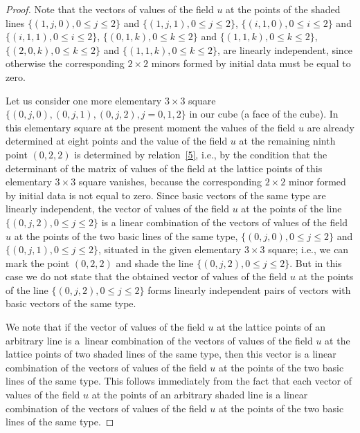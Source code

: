 \documentclass[pdftex]{sigma}
\begin{document}
\begin{proof}
Note that the vectors of values of the f\/ield $u$ at the points of
the shaded lines $\{(1, j, 0), 0 \leq j \leq 2\}$ and $\{(1, j, 1),
0 \leq j \leq 2\}$, $\{(i, 1, 0), 0 \leq i \leq 2\}$ and $\{(i, 1,
1), 0 \leq i \leq 2\}$, $\{(0, 1, k), 0 \leq k \leq 2\}$ and $\{(1,
1, k), 0 \leq k \leq 2\}$, $\{(2, 0, k), 0 \leq k \leq 2\}$ and
$\{(1, 1, k), 0 \leq k \leq 2\}$, are linearly independent, since
otherwise the corresponding $2 \times 2$ minors formed by initial
data must be equal to zero.



Let us consider one more elementary $3 \times 3$ square $\{(0, j,
0), (0, j, 1), (0, j, 2), j = 0, 1, 2\}$ in our cube (a face of the
cube). In this elementary square at the present moment the values of
the f\/ield $u$ are already determined at eight points and the value
of the f\/ield $u$ at the remaining ninth point $(0, 2, 2)$ is
determined by relation~\eqref{5}, i.e., by the condition that
the determinant of the matrix of values of the f\/ield at the lattice
points of this elementary $3 \times 3$ square vanishes, because the
corresponding $2 \times 2$ minor formed by initial data is not equal
to zero. Since basic vectors of the same type are linearly
independent, the vector of values of the f\/ield $u$ at the points of
the line $\{(0, j, 2), 0 \leq j \leq 2\}$ is a linear combination of
the vectors of values of the f\/ield $u$ at the points of the two
basic lines of the same type, $\{(0, j, 0), 0 \leq j \leq 2\}$ and
$\{(0, j, 1), 0 \leq j \leq 2\}$, situated in the given elementary
$3 \times 3$ square; i.e., we can mark the point $(0, 2, 2)$ and
shade the line $\{(0, j, 2), 0 \leq j \leq 2\}$. But in this case we
do not state that the obtained vector of values of the f\/ield $u$ at
the points of the line $\{(0, j, 2), 0 \leq j \leq 2\}$ forms
linearly independent pairs of vectors with basic vectors of the same
type.



We note that if the vector of values of the f\/ield $u$ at the lattice
points of an arbitrary line is a~linear combination of the vectors
of values of the f\/ield $u$ at the lattice points of two shaded lines
of the same type, then this vector is a linear combination of the
vectors of values of the f\/ield $u$ at the points of the two basic
lines of the same type. This follows immediately from the fact that
each vector of values of the f\/ield $u$ at the points of an arbitrary
shaded line is a linear combination of the vectors of values of the
f\/ield $u$ at the points of the two basic lines of the same type.


\end{proof}
\end{document}
